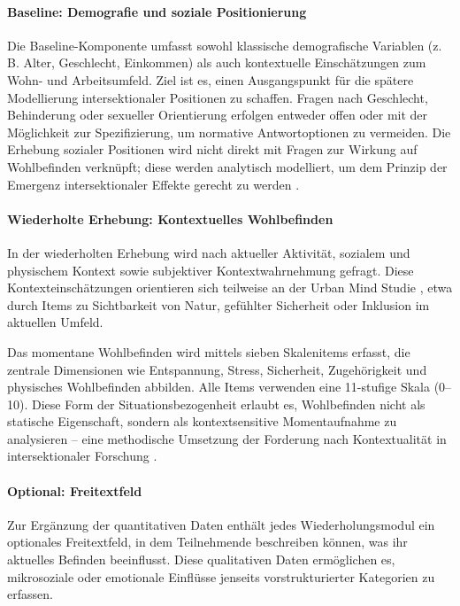 \paragraph{Baseline: Demografie und soziale Positionierung}

Die Baseline-Komponente umfasst sowohl klassische demografische Variablen (z.\,B. Alter, Geschlecht, Einkommen) als auch kontextuelle Einschätzungen zum Wohn- und Arbeitsumfeld. Ziel ist es, einen Ausgangspunkt für die spätere Modellierung intersektionaler Positionen zu schaffen. Fragen nach Geschlecht, Behinderung oder sexueller Orientierung erfolgen entweder offen oder mit der Möglichkeit zur Spezifizierung, um normative Antwortoptionen zu vermeiden. Die Erhebung sozialer Positionen wird nicht direkt mit Fragen zur Wirkung auf Wohlbefinden verknüpft; diese werden analytisch modelliert, um dem Prinzip der Emergenz intersektionaler Effekte gerecht zu werden \parencite{bauerIntersectionalityQuantitativeResearch2021}.

\paragraph{Wiederholte Erhebung: Kontextuelles Wohlbefinden}

In der wiederholten Erhebung wird nach aktueller Aktivität, sozialem und physischem Kontext sowie subjektiver Kontextwahrnehmung gefragt. Diese Kontexteinschätzungen orientieren sich teilweise an der Urban Mind Studie \parencite{bakolisUrbanMindUsing2018}, etwa durch Items zu Sichtbarkeit von Natur, gefühlter Sicherheit oder Inklusion im aktuellen Umfeld.

Das momentane Wohlbefinden wird mittels sieben Skalenitems erfasst, die zentrale Dimensionen wie Entspannung, Stress, Sicherheit, Zugehörigkeit und physisches Wohlbefinden abbilden. Alle Items verwenden eine 11-stufige Skala (0–10). Diese Form der Situationsbezogenheit erlaubt es, Wohlbefinden nicht als statische Eigenschaft, sondern als kontextsensitive Momentaufnahme zu analysieren – eine methodische Umsetzung der Forderung nach Kontextualität in intersektionaler Forschung \parencite{rodo-de-zarateDevelopingGeographiesIntersectionality2014}.

\paragraph{Optional: Freitextfeld}

Zur Ergänzung der quantitativen Daten enthält jedes Wiederholungsmodul ein optionales Freitextfeld, in dem Teilnehmende beschreiben können, was ihr aktuelles Befinden beeinflusst. Diese qualitativen Daten ermöglichen es, mikrosoziale oder emotionale Einflüsse jenseits vorstrukturierter Kategorien zu erfassen.

